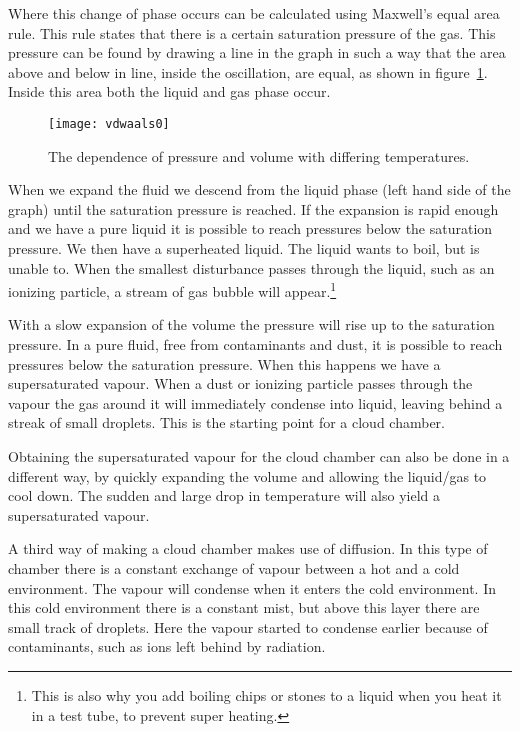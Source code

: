 Where this change of phase occurs can be calculated using Maxwell's equal area rule. This rule states that there is a certain saturation pressure of the gas. This pressure can be found by drawing a line in the graph in such a way that the area above and below in line, inside the oscillation, are equal, as shown in figure~\ref{fig:vdw0}. Inside this area both the liquid and gas phase occur. 

\begin{figure}\begin{center}
\texttt{[image: vdwaals0]}%
\caption{The dependence of pressure and volume with differing temperatures.}\label{fig:vdw0}
\end{center}\end{figure}

When we expand the fluid we descend from the liquid phase (left hand side of the graph) until the saturation pressure is reached. If the expansion is rapid enough and we have a pure liquid it is possible to reach pressures below the saturation pressure. We then have a superheated liquid. The liquid wants to boil, but is unable to. When the smallest disturbance passes through the liquid, such as an ionizing particle, a stream of gas bubble will appear.\footnote{This is also why you add boiling chips or stones to a liquid when you heat it in a test tube, to prevent super heating.}

With a slow expansion of the volume the pressure will rise up to the saturation pressure. In a pure fluid, free from contaminants and dust, it is possible to reach pressures below the saturation pressure. When this happens we have a supersaturated vapour. When a dust or ionizing particle passes through the vapour the gas around it will immediately condense into liquid, leaving behind a streak of small droplets. This is the starting point for a cloud chamber.

Obtaining the supersaturated vapour for the cloud chamber can also be done in a different way, by quickly expanding the volume and allowing the liquid/gas to cool down. The sudden and large drop in temperature will also yield a supersaturated vapour.

A third way of making a cloud chamber makes use of diffusion. In this type of chamber there is a constant exchange of vapour between a hot and a cold environment. The vapour will condense when it enters the cold environment. In this cold environment there is a constant mist, but above this layer there are small track of droplets. Here the vapour started to condense earlier because of contaminants, such as ions left behind by radiation.

